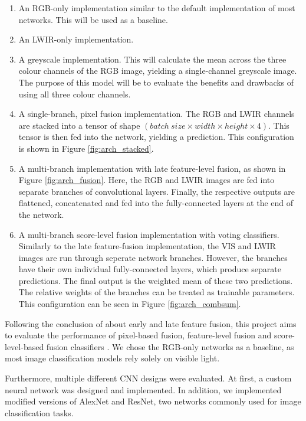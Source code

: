 \documentclass{l4proj}
\begin{document}
\begin{enumerate}
  \item An RGB-only implementation similar to the default implementation of most networks. This will be used as a baseline.
  \item An LWIR-only implementation.
  \item A greyscale implementation. This will calculate the mean across the three colour channels of the RGB image, yielding a single-channel greyscale image. The purpose of this model will be to evaluate the benefits and drawbacks of using all three colour channels.
  \item A single-branch, pixel fusion implementation. The RGB and LWIR channels are stacked into a tensor of shape $({batch\ size} \times width \times height \times 4)$. This tensor is then fed into the network, yielding a prediction. This configuration is shown in Figure \ref{fig:arch_stacked}.
  \item A multi-branch implementation with late feature-level fusion, as shown in Figure \ref{fig:arch_fusion}. Here, the RGB and LWIR images are fed into separate branches of convolutional layers. Finally, the respective outputs are flattened, concatenated and fed into the fully-connected layers at the end of the network.
  \item A multi-branch score-level fusion implementation with voting classifiers. Similarly to the late feature-fusion implementation, the VIS and LWIR images are run through seperate network branches. However, the branches have their own individual fully-connected layers, which produce separate predictions. The final output is the weighted mean of these two predictions. The relative weights of the branches can be treated as trainable parameters. This configuration can be seen in Figure \ref{fig:arch_combsum}.
\end{enumerate}

Following the conclusion of \citet{wagner_multispectral_2016} about early and late feature fusion, this project aims to evaluate the performance of pixel-based fusion, feature-level fusion and score-level-based fusion classifiers \citep{guo_face_2017}. We chose the RGB-only networks as a baseline, as most image classification models rely solely on visible light.

Furthermore, multiple different CNN designs were evaluated. At first, a custom neural network was designed and implemented. In addition, we implemented modified versions of AlexNet and ResNet, two networks commonly used for image classification tasks. 
\end{document}
